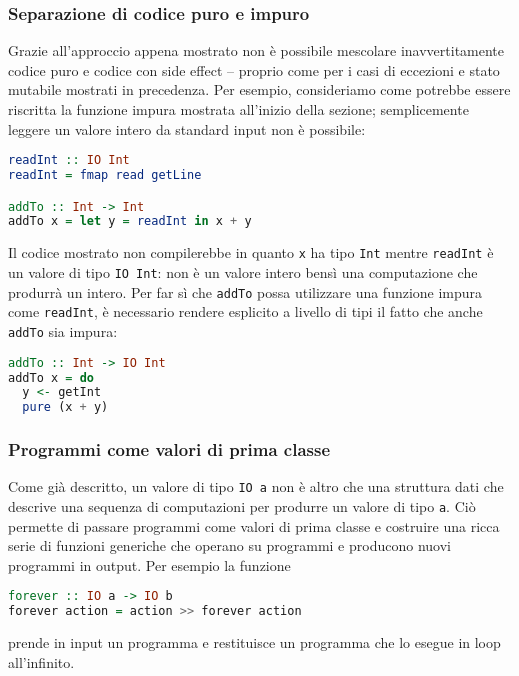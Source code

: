 \subsubsection{Separazione di codice puro e impuro}
Grazie all'approccio appena mostrato non è possibile mescolare inavvertitamente codice puro e codice con side effect -- proprio come per i casi di eccezioni e stato mutabile mostrati in precedenza. Per esempio, consideriamo come potrebbe essere riscritta la funzione impura mostrata all'inizio della sezione; semplicemente leggere un valore intero da standard input non è possibile:
\begin{lstlisting}[language=haskell]
readInt :: IO Int
readInt = fmap read getLine

addTo :: Int -> Int
addTo x = let y = readInt in x + y
\end{lstlisting}
Il codice mostrato non compilerebbe in quanto \lstinline{x} ha tipo \lstinline{Int} mentre \lstinline{readInt} è un valore di tipo \lstinline{IO Int}: non è un valore intero bensì una computazione che produrrà un intero. Per far sì che \lstinline{addTo} possa utilizzare una funzione impura come \lstinline{readInt}, è necessario rendere esplicito a livello di tipi il fatto che anche \lstinline{addTo} sia impura:
\begin{lstlisting}[language=haskell]
addTo :: Int -> IO Int
addTo x = do
  y <- getInt
  pure (x + y)
\end{lstlisting}

\subsubsection{Programmi come valori di prima classe}
Come già descritto, un valore di tipo \lstinline{IO a} non è altro che una struttura dati che descrive una sequenza di computazioni per produrre un valore di tipo \lstinline{a}. Ciò permette di passare programmi come valori di prima classe e costruire una ricca serie di funzioni generiche che operano su programmi e producono nuovi programmi in output. Per esempio la funzione
\begin{lstlisting}[language=haskell]
forever :: IO a -> IO b
forever action = action >> forever action
\end{lstlisting}
prende in input un programma e restituisce un programma che lo esegue in loop all'infinito.

